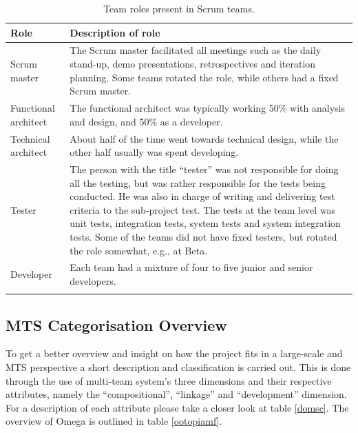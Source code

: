 \begin{center}
    \begin{longtable}{| p{3.5cm} | p{8cm} |}
   
    \hline \textbf{Role} & \textbf{Description of role} \\ \hline
    \endfirsthead

    \endhead

    \endfoot

   \endlastfoot 

    Scrum master & The Scrum master facilitated all meetings such as the daily stand-up, demo presentations, retrospectives and iteration planning. Some teams rotated the role, while others had a fixed Scrum master. \\ \hline
    Functional architect & The functional architect was typically working 50\% with analysis and design, and 50\% as a developer. \\ \hline
    Technical architect & About half of the time went towards technical design, while the other half usually was spent developing. \\ \hline
    Tester & The person with the title ``tester'' was not responsible for doing all the testing, but was rather responsible for the tests being conducted. He was also in charge of writing and delivering test criteria to the sub-project test. The tests at the team level was unit tests, integration tests, system tests and system integration tests. Some of the teams did not have fixed testers, but rotated the role somewhat, e.g., at Beta. \\ \hline
    Developer & Each team had a mixture of four to five junior and senior developers. \\ \hline
    \caption{Team roles present in Scrum teams.}
    \label{trpist}
    \end{longtable}
\end{center}


\subsection{MTS Categorisation Overview}

To get a better overview and insight on how the project fits in a large-scale and MTS perspective a short description and classification is carried out. This is done through the use of multi-team system's three dimensions and their respective attributes, namely the ``compositional'', ``linkage'' and ``development'' dimension. For a description of each attribute please take a closer look at table \ref{domsc}. The overview of Omega is outlined in table \ref{ootopiamf}.

